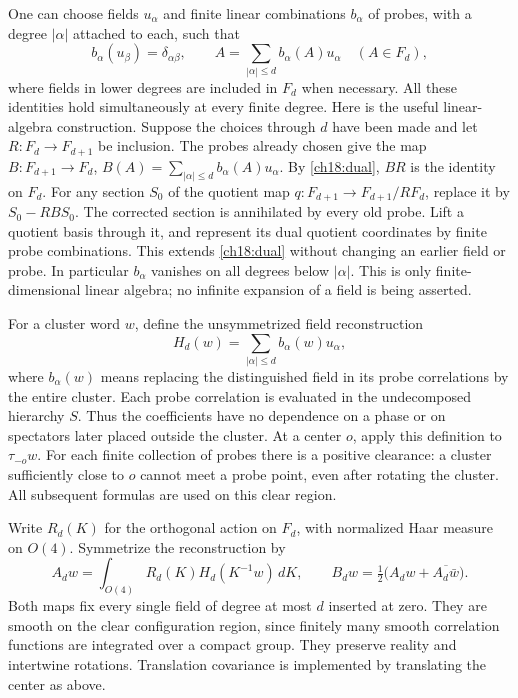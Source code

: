 One can choose fields $u_\alpha$ and finite linear combinations
$b_\alpha$ of probes, with a degree $|\alpha|$ attached to each, such that
\begin{equation}
 b_\alpha(u_\beta)=\delta_{\alpha\beta},\qquad
 A=\sum_{|\alpha|\le d}b_\alpha(A)u_\alpha\quad(A\in F_d),
 \label{ch18:dual}
\end{equation}
where fields in lower degrees are included in $F_d$ when necessary.
All these identities hold simultaneously at every finite degree.
Here is the useful linear-algebra construction. Suppose the choices
through $d$ have been made and let $R:F_d\to F_{d+1}$ be inclusion.
The probes already chosen give the map
$B:F_{d+1}\to F_d$, $B(A)=\sum_{|\alpha|\le d} b_\alpha(A)u_\alpha$.
By \eqref{ch18:dual}, $BR$ is the identity on $F_d$.
For any section $S_0$ of the quotient map
$q:F_{d+1}\to F_{d+1}/RF_d$, replace it by
$S_0-RBS_0$. The corrected section is annihilated by every old probe.
Lift a quotient basis through it, and represent its dual quotient
coordinates by finite probe combinations. This extends
\eqref{ch18:dual} without changing an earlier field or probe.
In particular $b_\alpha$ vanishes on all degrees below $|\alpha|$.
This is only finite-dimensional linear algebra; no infinite expansion
of a field is being asserted.

For a cluster word $w$, define the unsymmetrized field reconstruction
\[
 H_d(w)=\sum_{|\alpha|\le d}b_\alpha(w)u_\alpha,
\]
where $b_\alpha(w)$ means replacing the distinguished field in its
probe correlations by the entire cluster. Each probe correlation is evaluated in the undecomposed hierarchy $S$. Thus the coefficients have no dependence
on a phase or on spectators later placed outside the cluster.
At a center $o$, apply this definition to $\tau_{-o}w$.
For each finite collection of probes there is a positive clearance:
a cluster sufficiently close to $o$ cannot meet a probe point, even
after rotating the cluster. All subsequent formulas are used on this
clear region.

Write $R_d(K)$ for the orthogonal action on $F_d$, with normalized
Haar measure on $O(4)$. Symmetrize the reconstruction by
\[
 A_dw=\int_{O(4)}R_d(K)H_d(K^{-1}w)\,dK,
 \qquad B_dw=\tfrac12\bigl(A_dw+\overline{A_d\bar w}\bigr).
\]
Both maps fix every single field of degree at most $d$ inserted at zero.
They are smooth on the clear configuration region, since finitely many
smooth correlation functions are integrated over a compact group.
They preserve reality and intertwine rotations. Translation covariance
is implemented by translating the center as above.

